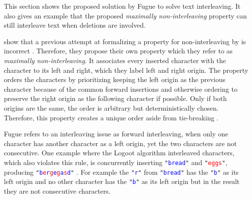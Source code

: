 This section shows the proposed solution by Fugue \cite{2023-weidner-minimizing-interleaving} to solve text interleaving. It also gives an example that the proposed \textit{maximally non-interleaving} property can still interleave text when deletions are involved.

 \cite{2023-weidner-minimizing-interleaving} show that a previous attempt at formalizing a property for non-interleaving by  \cite{2019-Kleppmann-incorrect-noninterleaving-property} is incorrect \cite[Section 2.5]{2023-weidner-minimizing-interleaving}. Therefore, they propose their own property which they refer to as \textit{maximally non-interleaving}. It associates every inserted character with the character to its left and right, which they label left and right origin. The property orders the characters by prioritizing keeping the left origin as the previous character because of the common forward insertions and otherwise ordering to preserve the right origin as the following character if possible. Only if both origins are the same, the order is arbitrary but deterministically chosen. Therefore, this property creates a unique order aside from tie-breaking \cite[Section 4.5]{2023-weidner-minimizing-interleaving}.

Fugue refers to an interleaving issue as forward interleaving, when only one character has another character as a left origin, yet the two characters are not consecutive. One example where the Logoot algorithm \cite{2009-weiss-logoot} interleaved characters, which also violates this rule, is concurrently inserting \texttt{"\textcolor{blue}{bread}"} and \texttt{"\textcolor{red}{eggs}"}, producing \texttt{"\textcolor{blue}{b}\textcolor{red}{e}\textcolor{blue}{r}\textcolor{red}{g}\textcolor{blue}{e}\textcolor{red}{g}\textcolor{blue}{a}\textcolor{red}{s}\textcolor{blue}{d}"} \cite[Section 4.4.1]{2019-sun-difference-ot-crdt-2-correctness-complexity}. For example the \texttt{"\textcolor{blue}{r}"} from \texttt{"\textcolor{blue}{bread}"} has the \texttt{"\textcolor{blue}{b}"} as its left origin and no other character has the \texttt{"\textcolor{blue}{b}"} as its left origin but in the result they are not consecutive characters.

